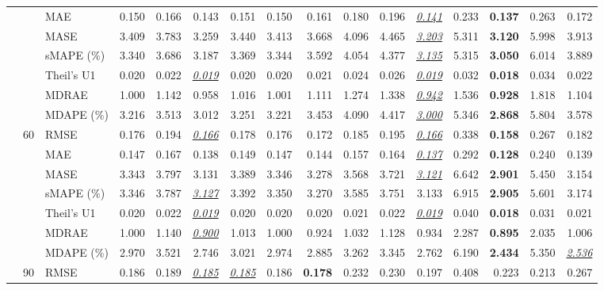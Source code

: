 \begin{table}[!htbp]
{\begin{tabular}{lllrrrrrrrrrrrrr}
 &  & MAE & 0.150 & 0.166 & 0.143 & 0.151 & 0.150 & 0.161 & 0.180 & 0.196 & \underline{\textit{0.141}} & 0.233 & \textbf{0.137} & 0.263 & 0.172 \\
 &  & MASE & 3.409 & 3.783 & 3.259 & 3.440 & 3.413 & 3.668 & 4.096 & 4.465 & \underline{\textit{3.203}} & 5.311 & \textbf{3.120} & 5.998 & 3.913 \\
 &  & sMAPE (\%) & 3.340 & 3.686 & 3.187 & 3.369 & 3.344 & 3.592 & 4.054 & 4.377 & \underline{\textit{3.135}} & 5.315 & \textbf{3.050} & 6.014 & 3.889 \\
 &  & Theil's U1 & 0.020 & 0.022 & \underline{\textit{0.019}} & 0.020 & 0.020 & 0.021 & 0.024 & 0.026 & \underline{\textit{0.019}} & 0.032 & \textbf{0.018} & 0.034 & 0.022 \\
 &  & MDRAE & 1.000 & 1.142 & 0.958 & 1.016 & 1.001 & 1.111 & 1.274 & 1.338 & \underline{\textit{0.942}} & 1.536 & \textbf{0.928} & 1.818 & 1.104 \\
 &  & MDAPE (\%) & 3.216 & 3.513 & 3.012 & 3.251 & 3.221 & 3.453 & 4.090 & 4.417 & \underline{\textit{3.000}} & 5.346 & \textbf{2.868} & 5.804 & 3.578 \\
\cmidrule(lr){2-16}
 & 60 & RMSE & 0.176 & 0.194 & \underline{\textit{0.166}} & 0.178 & 0.176 & 0.172 & 0.185 & 0.195 & \underline{\textit{0.166}} & 0.338 & \textbf{0.158} & 0.267 & 0.182 \\
 &  & MAE & 0.147 & 0.167 & 0.138 & 0.149 & 0.147 & 0.144 & 0.157 & 0.164 & \underline{\textit{0.137}} & 0.292 & \textbf{0.128} & 0.240 & 0.139 \\
 &  & MASE & 3.343 & 3.797 & 3.131 & 3.389 & 3.346 & 3.278 & 3.568 & 3.721 & \underline{\textit{3.121}} & 6.642 & \textbf{2.901} & 5.450 & 3.154 \\
 &  & sMAPE (\%) & 3.346 & 3.787 & \underline{\textit{3.127}} & 3.392 & 3.350 & 3.270 & 3.585 & 3.751 & 3.133 & 6.915 & \textbf{2.905} & 5.601 & 3.174 \\
 &  & Theil's U1 & 0.020 & 0.022 & \underline{\textit{0.019}} & 0.020 & 0.020 & 0.020 & 0.021 & 0.022 & \underline{\textit{0.019}} & 0.040 & \textbf{0.018} & 0.031 & 0.021 \\
 &  & MDRAE & 1.000 & 1.140 & \underline{\textit{0.900}} & 1.013 & 1.000 & 0.924 & 1.032 & 1.128 & 0.934 & 2.287 & \textbf{0.895} & 2.035 & 1.006 \\
 &  & MDAPE (\%) & 2.970 & 3.521 & 2.746 & 3.021 & 2.974 & 2.885 & 3.262 & 3.345 & 2.762 & 6.190 & \textbf{2.434} & 5.350 & \underline{\textit{2.536}} \\
\cmidrule(lr){2-16}
 & 90 & RMSE & 0.186 & 0.189 & \underline{\textit{0.185}} & \underline{\textit{0.185}} & 0.186 & \textbf{0.178} & 0.232 & 0.230 & 0.197 & 0.408 & 0.223 & 0.213 & 0.267 \\

\end{tabular}}
\end{table}
